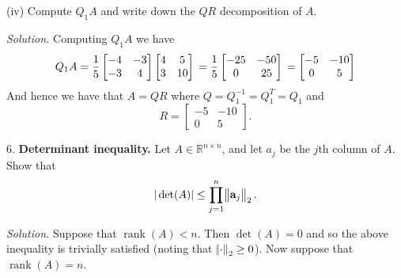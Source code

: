 \documentclass{article}
\def\*#1{\mathbf{#1}}
\DeclareMathOperator{\rank}{rank}
\newcommand{\R}{\mathbb{R}}
\begin{document}
\vspace{5mm}

(iv) Compute $Q_1 A$ and write down the $QR$ decomposition of $A$.

\textit{Solution.}
Computing $Q_1 A$ we have
%
\begin{equation*}
    Q_1 A =
        \frac{1}{5}
        \begin{bmatrix}
            -4 & -3 \\
            -3 & 4
        \end{bmatrix}
       \begin{bmatrix}
           4 & 5 \\
           3 & 10
       \end{bmatrix}
       \\ =
        \frac{1}{5}
        \begin{bmatrix}
            -25 & -50 \\
            0 & 25
        \end{bmatrix}
       \\ =
        \begin{bmatrix}
            -5 & -10 \\
            0 & 5
        \end{bmatrix}
\end{equation*}
%
And hence we have that $A = QR$ where $Q = Q_1^{-1} = Q_1^T = Q_1$
and
%
\begin{equation*}
    R =
    \begin{bmatrix}
        -5 & -10 \\
        0 & 5
    \end{bmatrix}
    .
\end{equation*}

\newpage

6. \textbf{Determinant inequality.}
Let $A \in \R^{n \times n}$, and let $a_j$ be the $j$th column of $A$.
Show that
%
\begin{equation*}
    |\det(A)| \leq \prod_{j = 1}^n \enVert{\*a_j}_2
    .
\end{equation*}

\textit{Solution.}
Suppose that $\rank(A) < n$. Then $\det(A) = 0$ and so the above inequality
is trivially satisfied (noting that $\enVert{\cdot}_2 \geq 0$). Now suppose
that $\rank(A) = n$.
\end{document}
